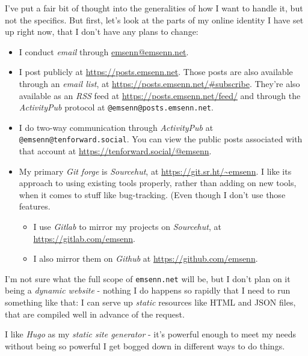 \documentclass[11pt]{article}
\begin{document}
I've put a fair bit of thought into the generalities of how I want to
handle it, but not the specifics. But first, let's look at the parts
of my online identity I have set up right now, that I don't have any
plans to change:

\begin{itemize}
\item I conduct \emph{email} through \href{mailto:emsenn@emsenn.net}{emsenn@emsenn.net}.
\item I post publicly at \href{https://posts.emsenn.net}{https://posts.emsenn.net}. Those posts are also
available through an \emph{email list}, at
\href{https://posts.emsenn.net/\#subscribe}{https://posts.emsenn.net/\#subscribe}. They're also available as an
\emph{RSS} feed at \href{https://posts.emsenn.net/feed/}{https://posts.emsenn.net/feed/} and through the
\emph{ActivityPub} protocol at \texttt{@emsenn@posts.emsenn.net}.
\item I do two-way communication through \emph{ActivityPub} at
\texttt{@emsenn@tenforward.social}. You can view the public posts
associated with that account at \href{https://tenforward.social/@emsenn}{https://tenforward.social/@emsenn}.
\item My primary \emph{Git forge} is \emph{Sourcehut}, at \href{https://git.sr.ht/\~emsenn}{https://git.sr.ht/\textasciitilde{}emsenn}.
I like its approach to using existing tools properly, rather than
adding on new tools, when it comes to stuff like bug-tracking. (Even
though I don't use those features.
\begin{itemize}
\item I use \emph{Gitlab} to mirror my projects on \emph{Sourcehut}, at
\href{https://gitlab.com/emsenn}{https://gitlab.com/emsenn}.
\item I also mirror them on \emph{Github} at \href{https://github.com/emsenn}{https://github.com/emsenn}.
\end{itemize}
\end{itemize}

I'm not sure what the full scope of \texttt{emsenn.net} will be, but I don't
plan on it being a \emph{dynamic website} - nothing I do happens so rapidly
that I need to run something like that: I can serve up \emph{static}
resources like HTML and JSON files, that are compiled well in advance
of the request.

I like \emph{Hugo} as my \emph{static site generator} - it's powerful enough to
meet my needs without being so powerful I get bogged down in different
ways to do things.
\end{document}
